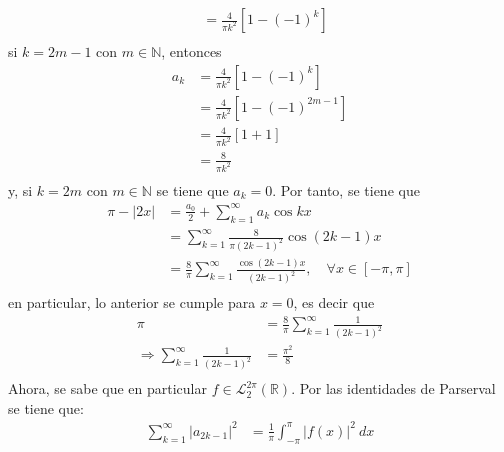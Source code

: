 \documentclass[12pt]{report}
\newcounter{it}
\theoremstyle{largebreak}
\newcommand\abs[1]{\ensuremath{\left|#1\right|}}
\begin{document}
\begin{sol}
\begin{equation*}
\begin{split}
                &=\frac{4}{\pi k^2}\left[1-(-1)^k \right]\\
            \end{split}
        \end{equation*}
        si $k=2m-1$ con $m\in\mathbb{N}$, entonces
        \begin{equation*}
            \begin{split}
                a_k&=\frac{4}{\pi k^2}\left[1-(-1)^k\right]\\
                &=\frac{4}{\pi k^2}\left[1-(-1)^{2m-1}\right]\\
                &=\frac{4}{\pi k^2}\left[1+1 \right]\\
                &=\frac{8}{\pi k^2}\\
            \end{split}
        \end{equation*}
        y, si $k=2m$ con $m\in\mathbb{N}$ se tiene que $a_k=0$. Por tanto, se tiene que
        \begin{equation*}
            \begin{split}
                \pi-\abs{2x}&=\frac{a_0}{2}+\sum_{ k=1}^\infty a_k\cos kx\\
                &=\sum_{ k=1}^\infty \frac{8}{\pi (2k-1)^2}\cos (2k-1)x\\
                &=\frac{8}{\pi}\sum_{ k=1}^\infty\frac{\cos (2k-1)x}{(2k-1)^2},\quad\forall x\in[-\pi,\pi] \\
            \end{split}
        \end{equation*}
        en particular, lo anterior se cumple para $x=0$, es decir que
        \begin{equation*}
            \begin{split}
                \pi&=\frac{8}{\pi}\sum_{ k=1}^\infty\frac{1}{(2k-1)^2}\\
                \Rightarrow \sum_{ k=1}^\infty\frac{1}{(2k-1)^2}&=\frac{\pi^2}{8}\\
            \end{split}
        \end{equation*}
        Ahora, se sabe que en particular $f\in\mathcal{L}_2^{2\pi}(\mathbb{R})$. Por las identidades de Parserval se tiene que:
        \begin{equation*}
            \begin{split}
                \sum_{ k=1}^\infty\abs{a_{2k-1}}^2&=\frac{1}{\pi}\int_{-\pi}^\pi\abs{f(x)}^2\:dx\\

\end{split}
\end{equation*}
\end{sol}
\end{document}

